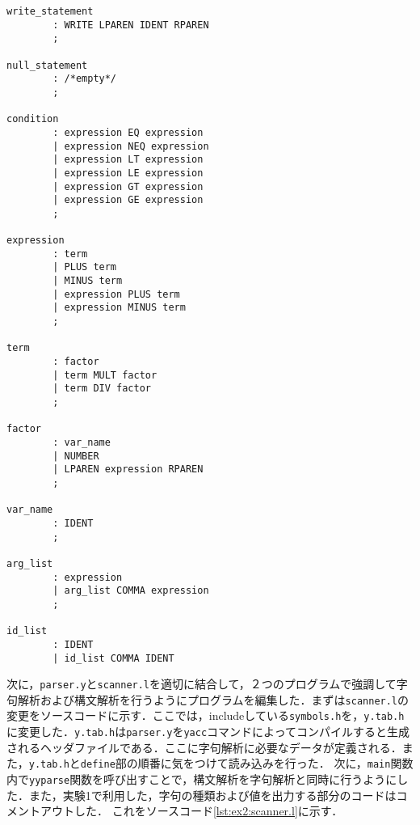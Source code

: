 \documentclass[uplatex]{jsarticle}
\begin{document}
\begin{lstlisting}[caption=構文規則の追加定義,label=lst:ex2:bnf]
write_statement
        : WRITE LPAREN IDENT RPAREN
        ;

null_statement
        : /*empty*/
        ;

condition
        : expression EQ expression
        | expression NEQ expression
        | expression LT expression
        | expression LE expression
        | expression GT expression
        | expression GE expression
        ;

expression
        : term
        | PLUS term
        | MINUS term
        | expression PLUS term
        | expression MINUS term
        ;

term
        : factor
        | term MULT factor
        | term DIV factor
        ;

factor
        : var_name
        | NUMBER
        | LPAREN expression RPAREN
        ;

var_name
        : IDENT
        ;

arg_list
        : expression
        | arg_list COMMA expression
        ;

id_list
        : IDENT
        | id_list COMMA IDENT
\end{lstlisting}
次に，\verb#parser.y#と\verb#scanner.l#を適切に結合して，２つのプログラムで強調して字句解析および構文解析を行うようにプログラムを編集した．まずは\verb#scanner.l#の変更をソースコードに示す．ここでは，includeしている\verb#symbols.h#を，\verb#y.tab.h#に変更した．\verb#y.tab.h#は\verb#parser.y#を\verb#yacc#コマンドによってコンパイルすると生成されるヘッダファイルである．ここに字句解析に必要なデータが定義される．また，\verb#y.tab.h#と\verb#define#部の順番に気をつけて読み込みを行った．
次に，\verb#main#関数内で\verb#yyparse#関数を呼び出すことで，構文解析を字句解析と同時に行うようにした．また，実験1で利用した，字句の種類および値を出力する部分のコードはコメントアウトした．
これをソースコード\ref{lst:ex2:scanner.l}に示す．
\end{document}
